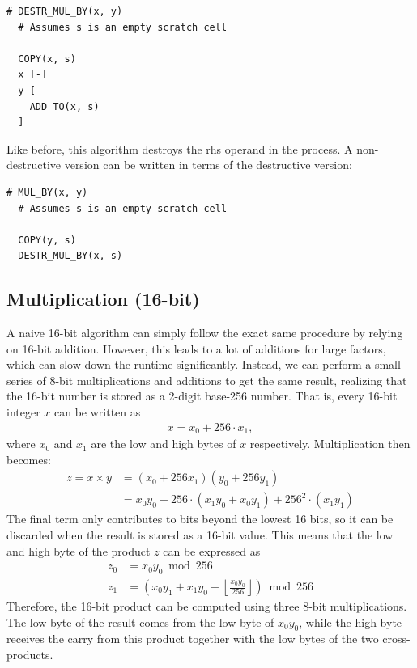 \vspace{0.5cm}\noindent\begin{minipage}{\linewidth}
\begin{lstlisting}[style=brainfuck]
  # DESTR_MUL_BY(x, y)
  # Assumes s is an empty scratch cell
  
  COPY(x, s)
  x [-]
  y [-
    ADD_TO(x, s)
  ]
\end{lstlisting}
\end{minipage}
%
Like before, this algorithm destroys the rhs operand in the process. A non-destructive version can be written in terms of the destructive version:

\vspace{0.5cm}\noindent\begin{minipage}{\linewidth}
\begin{lstlisting}[style=brainfuck]
  # MUL_BY(x, y)
  # Assumes s is an empty scratch cell
  
  COPY(y, s)
  DESTR_MUL_BY(x, s)
\end{lstlisting}
\end{minipage}


\subsection{Multiplication (16-bit)}\label{sec:compilation:mul16} A naive 16-bit algorithm can simply follow the exact same procedure by relying on 16-bit addition. However, this leads to a lot of additions for large factors, which can slow down the runtime significantly. Instead, we can perform a small series of 8-bit multiplications and additions to get the same result, realizing that the 16-bit number is stored as a 2-digit base-256 number. That is, every 16-bit integer $x$ can be written as
%
\begin{align}
  x = x_0 + 256\cdot x_1,
\end{align}
%
where $x_0$ and $x_1$ are the low and high bytes of $x$ respectively. Multiplication then becomes:
%
\begin{align}
  z = x \times y &= (x_0 + 256x_1)(y_0 + 256y_1) \\
                 &= x_0y_0 + 256\cdot(x_1y_0 + x_0y_1) + 256^2\cdot(x_1y_1)
\end{align}
%
The final term only contributes to bits beyond the lowest 16 bits, so it can be discarded when the result is stored as a 16-bit value. This means that the low and high byte of the product $z$ can be expressed as
%
\begin{align}
z_0 &= x_0 y_0 \bmod 256 \\
z_1 &= \left(x_0 y_1 + x_1 y_0 + \left\lfloor \frac{x_0 y_0}{256} \right\rfloor \right) \bmod 256 
\end{align}
%
Therefore, the 16-bit product can be computed using three 8-bit multiplications. The low byte of the result comes from the low byte of $x_0y_0$, while the high byte receives the carry from this product together with the low bytes of the two cross-products.

